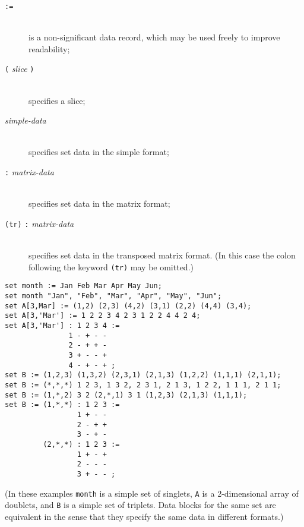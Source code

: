 \documentclass[11pt]{report}
\def\para#1{\noindent{\bf#1}}
\begin{document}
\vspace*{-8pt}

\begin{description}
\item[{\tt :=}]\hspace*{0pt}\\
is a non-significant data record, which may be used freely to improve
readability;
\item[{\tt(} {\it slice} {\tt)}]\hspace*{0pt}\\
specifies a slice;
\item[{\it simple-data}]\hspace*{0pt}\\
specifies set data in the simple format;
\item[{\tt:} {\it matrix-data}]\hspace*{0pt}\\
specifies set data in the matrix format;
\item[{\tt(tr)} {\tt:} {\it matrix-data}]\hspace*{0pt}\\
specifies set data in the transposed matrix format. (In this case the
colon following the keyword {\tt(tr)} may be omitted.)
\end{description}

\vspace*{-8pt}

\para{Examples}

\begin{verbatim}
set month := Jan Feb Mar Apr May Jun;
set month "Jan", "Feb", "Mar", "Apr", "May", "Jun";
set A[3,Mar] := (1,2) (2,3) (4,2) (3,1) (2,2) (4,4) (3,4);
set A[3,'Mar'] := 1 2 2 3 4 2 3 1 2 2 4 4 2 4;
set A[3,'Mar'] : 1 2 3 4 :=
               1 - + - -
               2 - + + -
               3 + - - +
               4 - + - + ;
set B := (1,2,3) (1,3,2) (2,3,1) (2,1,3) (1,2,2) (1,1,1) (2,1,1);
set B := (*,*,*) 1 2 3, 1 3 2, 2 3 1, 2 1 3, 1 2 2, 1 1 1, 2 1 1;
set B := (1,*,2) 3 2 (2,*,1) 3 1 (1,2,3) (2,1,3) (1,1,1);
set B := (1,*,*) : 1 2 3 :=
                 1 + - -
                 2 - + +
                 3 - + -
         (2,*,*) : 1 2 3 :=
                 1 + - +
                 2 - - -
                 3 + - - ;
\end{verbatim}

\noindent(In these examples {\tt month} is a simple set of singlets,
{\tt A} is a 2-dimensional array of doublets, and {\tt B} is a simple
set of triplets. Data blocks for the same set are equivalent in the
sense that they specify the same data in different formats.)
\end{document}
